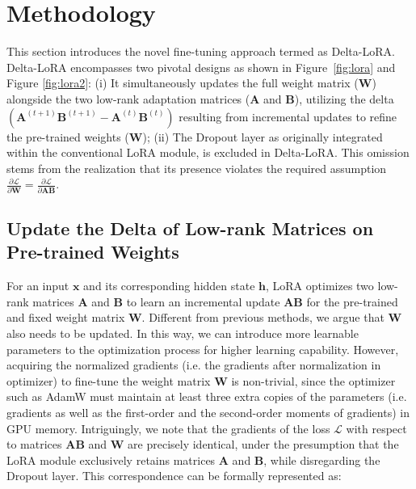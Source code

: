 {\section{Methodology}\label{sec:Methodology}
This section introduces the novel fine-tuning approach termed as Delta-LoRA. Delta-LoRA encompasses two pivotal designs as shown in Figure~\ref{fig:lora} and Figure \ref{fig:lora2}: (i) It simultaneously updates the full weight matrix ($\boldsymbol{W}$) alongside the two low-rank adaptation matrices ($\boldsymbol{A}$ and $\boldsymbol{B}$), utilizing the delta $(\boldsymbol{A}^{(t+1)}\boldsymbol{B}^{(t+1)} - \boldsymbol{A}^{(t)}\boldsymbol{B}^{(t)})$ resulting from incremental updates to refine the pre-trained weights ($\boldsymbol{W}$); 
(ii) The Dropout layer as originally integrated within the conventional LoRA module, is excluded in Delta-LoRA. This omission stems from the realization that its presence violates the required assumption$\frac{\partial {\mathcal{L}}}{\partial \boldsymbol{W}} = \frac{\partial {\mathcal{L}}}{\partial \boldsymbol{A}\boldsymbol{B}}$. 

\subsection{Update the Delta of Low-rank Matrices on Pre-trained Weights} For an input $\boldsymbol{x}$ and its corresponding hidden state $\boldsymbol{h}$, LoRA optimizes two low-rank matrices $\boldsymbol{A}$ and $\boldsymbol{B}$ to learn an incremental update $\boldsymbol{A}\boldsymbol{B}$ for the pre-trained and fixed weight matrix $\boldsymbol{W}$.
Different from previous methods, we argue that $\boldsymbol{W}$ also needs to be updated. In this way, we can introduce more learnable parameters to the optimization process for higher learning capability. However, acquiring the normalized gradients (i.e. the gradients after normalization in optimizer) to fine-tune the weight matrix $\boldsymbol{W}$ is non-trivial, since the optimizer such as AdamW must maintain at least three extra copies of the parameters (i.e. gradients as well as the first-order and the second-order moments of gradients) in GPU memory. Intriguingly, we note that the gradients of the loss ${\mathcal{L}}$ with respect to matrices $\boldsymbol{A}\boldsymbol{B}$ and $\boldsymbol{W}$ are  precisely identical, under the presumption that the LoRA module exclusively retains matrices $\boldsymbol{A}$ and $\boldsymbol{B}$, while disregarding the Dropout layer. This correspondence can be formally represented as:

}
